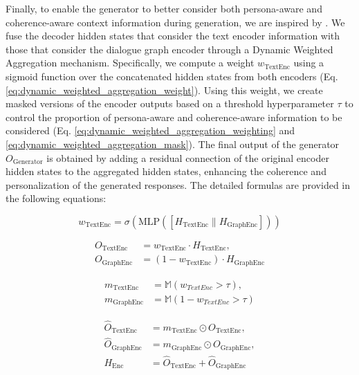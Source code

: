 Finally, to enable the generator to better consider both persona-aware and coherence-aware context information during generation, we are inspired by \cite{huang-etal-2023-paa}. We fuse the decoder hidden states that consider the text encoder information with those that consider the dialogue graph encoder through a Dynamic Weighted Aggregation mechanism. Specifically, we compute a weight $w_{\text{TextEnc}}$ using a sigmoid function over the concatenated hidden states from both encoders (Eq. \ref{eq:dynamic_weighted_aggregation_weight}). Using this weight, we create masked versions of the encoder outputs based on a threshold hyperparameter $\tau$ to control the proportion of persona-aware and coherence-aware information to be considered (Eq. \ref{eq:dynamic_weighted_aggregation_weighting} and \ref{eq:dynamic_weighted_aggregation_mask}). The final output of the generator $O_{\text{Generator}}$ is obtained by adding a residual connection of the original encoder hidden states to the aggregated hidden states, enhancing the coherence and personalization of the generated responses. The detailed formulas are provided in the following equations:

\begin{equation} \label{eq:dynamic_weighted_aggregation_weight}
    w_{\text{TextEnc}} = \sigma(\text{MLP}([H_{\text{TextEnc}} \parallel H_{\text{GraphEnc}}]))
\end{equation}

\begin{equation} \label{eq:dynamic_weighted_aggregation_weighting}
    \begin{aligned}
        O_{\text{TextEnc}} &= w_{\text{TextEnc}} \cdot H_{\text{TextEnc}}, \\
        O_{\text{GraphEnc}} &= (1 - w_{\text{TextEnc}}) \cdot H_{\text{GraphEnc}}
    \end{aligned}
\end{equation}

\begin{equation} \label{eq:dynamic_weighted_aggregation_mask}
    \begin{aligned}
        m_{\text{TextEnc}} &= \mathbb{M}(w_{TextEnc} > \tau), \\
        m_{\text{GraphEnc}} &= \mathbb{M}(1 - w_{TextEnc} > \tau)
    \end{aligned}
\end{equation}

\begin{equation}
    \begin{aligned}
        \hat{O}_{\text{TextEnc}} &= m_{\text{TextEnc}} \odot O_{\text{TextEnc}}, \\
        \hat{O}_{\text{GraphEnc}} &= m_{\text{GraphEnc}} \odot O_{\text{GraphEnc}}, \\
        H_{\text{Enc}} &= \hat{O}_{\text{TextEnc}} + \hat{O}_{\text{GraphEnc}}
    \end{aligned}
\end{equation}

